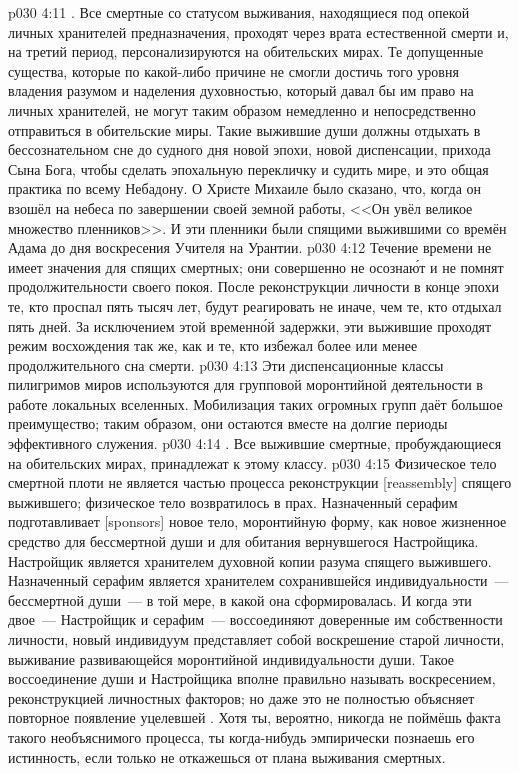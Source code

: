 \vs p030 4:11 . Все смертные со статусом выживания, находящиеся под опекой личных хранителей предназначения, проходят через врата естественной смерти и, на третий период, персонализируются на обительских мирах. Те допущенные существа, которые по какой\hyp{}либо причине не смогли достичь того уровня владения разумом и наделения духовностью, который давал бы им право на личных хранителей, не могут таким образом немедленно и непосредственно отправиться в обительские миры. Такие выжившие души должны отдыхать в бессознательном сне до судного дня новой эпохи, новой диспенсации, прихода Сына Бога, чтобы сделать эпохальную перекличку и судить мире, и это общая практика по всему Небадону. О Христе Михаиле было сказано, что, когда он взошёл на небеса по завершении своей земной работы, <<Он увёл великое множество пленников>>. И эти пленники были спящими выжившими со времён Адама до дня воскресения Учителя на Урантии.
\vs p030 4:12 Течение времени не имеет значения для спящих смертных; они совершенно не осозна\'ют и не помнят продолжительности своего покоя. После реконструкции личности в конце эпохи те, кто проспал пять тысяч лет, будут реагировать не иначе, чем те, кто отдыхал пять дней. За исключением этой временн\'ой задержки, эти выжившие проходят режим восхождения так же, как и те, кто избежал более или менее продолжительного сна смерти.
\vs p030 4:13 Эти диспенсационные классы пилигримов миров используются для групповой моронтийной деятельности в работе локальных вселенных. Мобилизация таких огромных групп даёт большое преимущество; таким образом, они остаются вместе на долгие периоды эффективного служения.
\vs p030 4:14 . Все выжившие смертные, пробуждающиеся на обительских мирах, принадлежат к этому классу.
\vs p030 4:15 Физическое тело смертной плоти не является частью процесса реконструкции [reassembly] спящего выжившего; физическое тело возвратилось в прах. Назначенный серафим подготавливает [sponsors] новое тело, моронтийную форму, как новое жизненное средство для бессмертной души и для обитания вернувшегося Настройщика. Настройщик является хранителем духовной копии разума спящего выжившего. Назначенный серафим является хранителем сохранившейся индивидуальности~--- бессмертной души~--- в той мере, в какой она сформировалась. И когда эти двое~--- Настройщик и серафим~--- воссоединяют доверенные им собственности личности, новый индивидуум представляет собой воскрешение старой личности, выживание развивающейся моронтийной индивидуальности души. Такое воссоединение души и Настройщика вполне правильно называть воскресением, реконструкцией личностных факторов; но даже это не полностью объясняет повторное появление уцелевшей . Хотя ты, вероятно, никогда не поймёшь факта такого необъяснимого процесса, ты когда\hyp{}нибудь эмпирически познаешь его истинность, если только не откажешься от плана выживания смертных.
